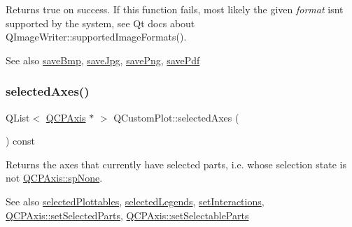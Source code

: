 Returns true on success. If this function fails, most likely the given {\itshape format} isn\textquotesingle{}t supported by the system, see Qt docs about Q\+Image\+Writer\+::supported\+Image\+Formats().

\begin{DoxySeeAlso}{See also}
\mbox{\hyperlink{class_q_custom_plot_a6629d9e8e6da4bf18055ee0257fdce9a}{save\+Bmp}}, \mbox{\hyperlink{class_q_custom_plot_a490c722092d1771e8ce4a7a73dfd84ab}{save\+Jpg}}, \mbox{\hyperlink{class_q_custom_plot_a7636261aff1f6d25c9da749ece3fc8b8}{save\+Png}}, \mbox{\hyperlink{class_q_custom_plot_a632da44c6d94ea8b271eb483b08b5114}{save\+Pdf}} 
\end{DoxySeeAlso}
\mbox{\label{class_q_custom_plot_a7e6b07792b1cb2c31681596582d14dbe}} 
\subsubsection{\texorpdfstring{selected\+Axes()}{selectedAxes()}}
{\footnotesize\ttfamily Q\+List$<$ \mbox{\hyperlink{class_q_c_p_axis}{Q\+C\+P\+Axis}} $\ast$ $>$ Q\+Custom\+Plot\+::selected\+Axes (\begin{DoxyParamCaption}{ }\end{DoxyParamCaption}) const}

Returns the axes that currently have selected parts, i.\+e. whose selection state is not \mbox{\hyperlink{class_q_c_p_axis_abee4c7a54c468b1385dfce2c898b115fae0df8123a5528d5ccf87cb7794f971ea}{Q\+C\+P\+Axis\+::sp\+None}}.

\begin{DoxySeeAlso}{See also}
\mbox{\hyperlink{class_q_custom_plot_a747faaab57c56891e901a1e97fa4359a}{selected\+Plottables}}, \mbox{\hyperlink{class_q_custom_plot_ac87624ddff1cbf4064781a8e8ae321c4}{selected\+Legends}}, \mbox{\hyperlink{class_q_custom_plot_a5ee1e2f6ae27419deca53e75907c27e5}{set\+Interactions}}, \mbox{\hyperlink{class_q_c_p_axis_ab9d7a69277dcbed9119b3c1f25ca19c3}{Q\+C\+P\+Axis\+::set\+Selected\+Parts}}, \mbox{\hyperlink{class_q_c_p_axis_a513f9b9e326c505d9bec54880031b085}{Q\+C\+P\+Axis\+::set\+Selectable\+Parts}} 
\end{DoxySeeAlso}
\mbox{\label{class_q_custom_plot_ad3547aded026d8a9ae6ef13a69080d06}} 
